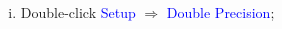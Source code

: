 \documentclass[10pt,compress, unknownkeysallowed]{beamer}
\newcommand{\blue}{\textcolor{blue}}
\begin{document}
\begin{frame}
\begin{columns}
           \begin{column}[l]{0.5\linewidth}
               \begin{enumerate}[i)]\scriptsize\setcounter{enumi}{4}
                   \item<3-> Double-click \blue{Setup} $\Rightarrow$ \blue{Double Precision};
               \end{enumerate}
           \end{column}
    \end{columns}
\end{frame}
    
\end{document}
